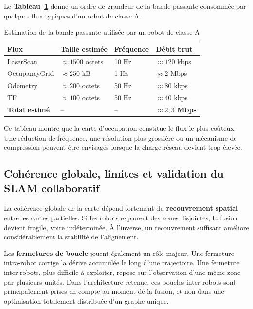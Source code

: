 \documentclass[11pt,a4paper]{report}
\newcommand{\kw}[1]{\textbf{#1}}
\begin{document}
Le \kw{Tableau~\ref{tab:bande_passante_classe_a}} donne un ordre de grandeur de la bande passante consommée par quelques flux typiques d’un robot de classe A.

\begin{table}[H]
\centering
\small
\begin{tabular}{|p{4cm}|p{3cm}|p{2.5cm}|p{3cm}|}
\hline
\textbf{Flux} & \textbf{Taille estimée} & \textbf{Fréquence} & \textbf{Débit brut} \\
\hline
LaserScan & $\approx 1500$ octets & 10 Hz & $\approx 120$ kbps \\
\hline
OccupancyGrid & $\approx 250$ kB & 1 Hz & $\approx 2$ Mbps \\
\hline
Odometry & $\approx 200$ octets & 50 Hz & $\approx 80$ kbps \\
\hline
TF & $\approx 100$ octets & 50 Hz & $\approx 40$ kbps \\
\hline
\textbf{Total estimé} & -- & -- & \textbf{$\approx 2{,}3$ Mbps} \\
\hline
\end{tabular}
\caption{Estimation de la bande passante utilisée par un robot de classe A}
\label{tab:bande_passante_classe_a}
\end{table}

Ce tableau montre que la carte d’occupation constitue le flux le plus coûteux. Une réduction de fréquence, une résolution plus grossière ou un mécanisme de compression peuvent être envisagés lorsque la charge réseau devient trop élevée.

\subsection{Cohérence globale, limites et validation du SLAM collaboratif}

La cohérence globale de la carte dépend fortement du \kw{recouvrement spatial} entre les cartes partielles. Si les robots explorent des zones disjointes, la fusion devient fragile, voire indéterminée. À l’inverse, un recouvrement suffisant améliore considérablement la stabilité de l’alignement.

Les \kw{fermetures de boucle} jouent également un rôle majeur. Une fermeture intra-robot corrige la dérive accumulée le long d’une trajectoire. Une fermeture inter-robots, plus difficile à exploiter, repose sur l’observation d’une même zone par plusieurs unités. Dans l’architecture retenue, ces boucles inter-robots sont principalement prises en compte au moment de la fusion, et non dans une optimisation totalement distribuée d’un graphe unique.
\end{document}
